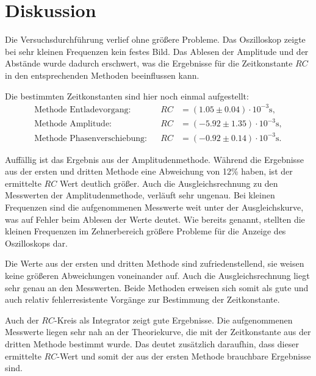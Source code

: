 \section{Diskussion}
\label{sec:Diskussion}

Die Versuchsdurchführung verlief ohne größere Probleme.
Das Oszilloskop zeigte bei sehr kleinen Frequenzen kein festes Bild.
Das Ablesen der Amplitude und der Abstände wurde dadurch erschwert,
was die Ergebnisse für die Zeitkonstante $RC$ in den entsprechenden Methoden beeinflussen kann.

\noindent
Die bestimmten Zeitkonstanten sind hier noch einmal aufgestellt:
\begin{align*}
    \text{Methode Entladevorgang:}& &RC &= (1.05 \pm 0.04) \cdot 10^{-3} \si{\second}, \\
    \text{Methode Amplitude:}&      &RC &= (-5.92 \pm 1.35) \cdot 10^{-3} \si{\second}, \\
    \text{Methode Phasenverschiebung:}&     &RC &= (-0.92 \pm 0.14) \cdot 10^{-3} \si{\second}.
\end{align*}

\noindent
Auffällig ist das Ergebnis aus der Amplitudenmethode.
Während die Ergebnisse aus der ersten und dritten Methode eine Abweichung von 12\% haben,
ist der ermittelte $RC$ Wert deutlich größer.
Auch die Ausgleichsrechnung zu den Messwerten der Amplitudenmethode, verläuft sehr ungenau.
Bei kleinen Frequenzen sind die aufgenommenen Messwerte weit unter der Ausgleichskurve,
was auf Fehler beim Ablesen der Werte deutet.
Wie bereits genannt, stellten die kleinen Frequenzen im Zehnerbereich größere Probleme für die Anzeige des Oszilloskops dar.

\noindent
Die Werte aus der ersten und dritten Methode sind zufriedenstellend,
sie weisen keine größeren Abweichungen voneinander auf.
Auch die Ausgleichsrechnung liegt sehr genau an den Messwerten.
Beide Methoden erweisen sich somit als gute und auch relativ fehlerresistente Vorgänge zur Bestimmung der Zeitkonstante.

\noindent
Auch der $RC$-Kreis als Integrator zeigt gute Ergebnisse.
Die aufgenommenen Messwerte liegen sehr nah an der Theoriekurve, die mit der Zeitkonstante aus der dritten Methode bestimmt wurde.
Das deutet zusätzlich daraufhin, dass dieser ermittelte $RC$-Wert und somit der aus der ersten Methode brauchbare Ergebnisse sind.


